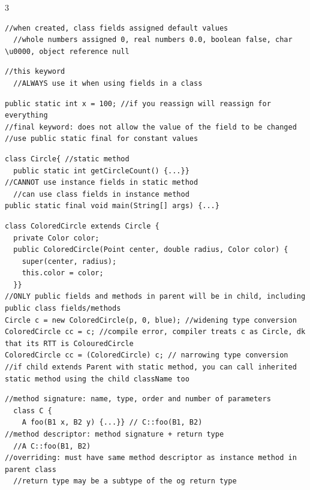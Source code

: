 \documentclass[10pt]{article}
\begin{document}
\begin{multicols*}{3}
\begin{verbatim}
//when created, class fields assigned default values
  //whole numbers assigned 0, real numbers 0.0, boolean false, char \u0000, object reference null
\end{verbatim}
\begin{verbatim}
//this keyword
  //ALWAYS use it when using fields in a class
\end{verbatim}
\begin{verbatim}
public static int x = 100; //if you reassign will reassign for everything
//final keyword: does not allow the value of the field to be changed
//use public static final for constant values
\end{verbatim}
\begin{verbatim}
class Circle{ //static method
  public static int getCircleCount() {...}}
//CANNOT use instance fields in static method
  //can use class fields in instance method
public static final void main(String[] args) {...}
\end{verbatim}
\begin{verbatim}
class ColoredCircle extends Circle {
  private Color color;
  public ColoredCircle(Point center, double radius, Color color) {
    super(center, radius);
    this.color = color;
  }}
//ONLY public fields and methods in parent will be in child, including public class fields/methods
Circle c = new ColoredCircle(p, 0, blue); //widening type conversion
ColoredCircle cc = c; //compile error, compiler treats c as Circle, dk that its RTT is ColouredCircle
ColoredCircle cc = (ColoredCircle) c; // narrowing type conversion
//if child extends Parent with static method, you can call inherited static method using the child className too
\end{verbatim}
\begin{verbatim}
//method signature: name, type, order and number of parameters
  class C {
    A foo(B1 x, B2 y) {...}} // C::foo(B1, B2)
//method descriptor: method signature + return type
  //A C::foo(B1, B2)
//overriding: must have same method descriptor as instance method in parent class
  //return type may be a subtype of the og return type

\end{verbatim}
\end{multicols*}
\end{document}
